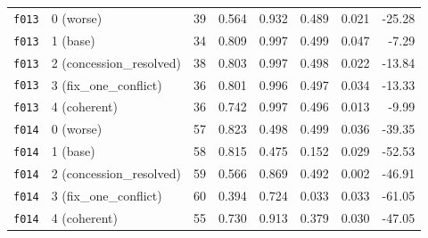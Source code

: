 \documentclass[11pt]{article}
\begin{document}
\begin{table}[htbp]
\begin{tabular}{llrrrrrr}
\midrule
\texttt{f013} & 0 (worse) & 39 & 0.564 & 0.932 & 0.489 & 0.021 & -25.28 \\
\texttt{f013} & 1 (base) & 34 & 0.809 & 0.997 & 0.499 & 0.047 & -7.29 \\
\texttt{f013} & 2 (concession\_resolved) & 38 & 0.803 & 0.997 & 0.498 & 0.022 & -13.84 \\
\texttt{f013} & 3 (fix\_one\_conflict) & 36 & 0.801 & 0.996 & 0.497 & 0.034 & -13.33 \\
\texttt{f013} & 4 (coherent) & 36 & 0.742 & 0.997 & 0.496 & 0.013 & -9.99 \\
\midrule
\texttt{f014} & 0 (worse) & 57 & 0.823 & 0.498 & 0.499 & 0.036 & -39.35 \\
\texttt{f014} & 1 (base) & 58 & 0.815 & 0.475 & 0.152 & 0.029 & -52.53 \\
\texttt{f014} & 2 (concession\_resolved) & 59 & 0.566 & 0.869 & 0.492 & 0.002 & -46.91 \\
\texttt{f014} & 3 (fix\_one\_conflict) & 60 & 0.394 & 0.724 & 0.033 & 0.033 & -61.05 \\
\texttt{f014} & 4 (coherent) & 55 & 0.730 & 0.913 & 0.379 & 0.030 & -47.05 \\
\bottomrule
\end{tabular}
\end{table}
\end{document}
